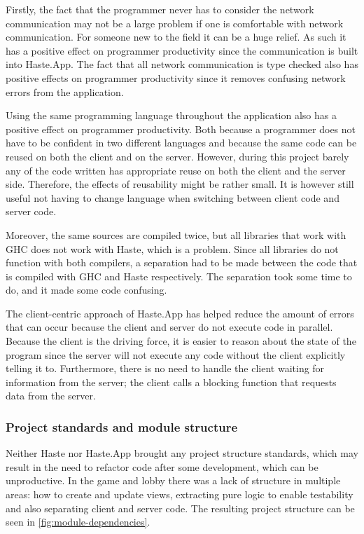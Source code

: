 \documentclass[a4paper]{article}
\begin{document}
Firstly, the fact that the programmer never has to consider the network communication may not be a large problem if one is comfortable with network communication. For someone new to the field it can be a huge relief. As such it has a positive effect on programmer productivity since the communication is built into Haste.App. The fact that all network communication is type checked also has positive effects on programmer productivity since it removes confusing network errors from the application.

Using the same programming language throughout the application also has a positive effect on programmer productivity. Both because a programmer does not have to be confident in two different languages and because the same code can be reused on both the client and on the server. However, during this project barely any of the code written has appropriate reuse on both the client and the server side. Therefore, the effects of reusability might be rather small. It is however still useful not having to change language when switching between client code and server code.

Moreover, the same sources are compiled twice, but all libraries that work with GHC does not work with Haste, which is a problem. Since all libraries do not function with both compilers, a separation had to be made between the code that is compiled with GHC and Haste respectively. The separation took some time to do, and it made some code confusing.

The client-centric approach of Haste.App has helped reduce the amount of errors that can occur because the client and server do not execute code in parallel. Because the client is the driving force, it is easier to reason about the state of the program since the server will not execute any code without the client explicitly telling it to. Furthermore, there is no need to handle the client waiting for information from the server; the client calls a blocking function that requests data from the server.


\subsubsection{Project standards and module structure}
Neither Haste nor Haste.App brought any project structure standards, which may result in the need to refactor code after some development, which can be unproductive. In the game and lobby there was a lack of structure in multiple areas: how to create and update views, extracting pure logic to enable testability and also separating client and server code. The resulting project structure can be seen in \cref{fig:module-dependencies}.
\end{document}

